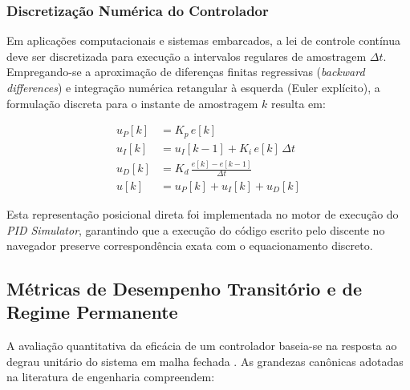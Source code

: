 \subsubsection{Discretização Numérica do Controlador}
\label{subsubsec:discretizacao_pid}

Em aplicações computacionais e sistemas embarcados, a lei de controle contínua deve ser discretizada para execução a intervalos regulares de amostragem $\Delta t$. Empregando-se a aproximação de diferenças finitas regressivas (\textit{backward differences}) e integração numérica retangular à esquerda (Euler explícito), a formulação discreta para o instante de amostragem $k$ resulta em:

\begin{align}
    u_P[k] &= K_p \, e[k] \label{eq:p_discreto} \\
    u_I[k] &= u_I[k-1] + K_i \, e[k] \, \Delta t \label{eq:i_discreto} \\
    u_D[k] &= K_d \, \frac{e[k] - e[k-1]}{\Delta t} \label{eq:d_discreto} \\
    u[k] &= u_P[k] + u_I[k] + u_D[k] \label{eq:pid_discreto}
\end{align}

Esta representação posicional direta foi implementada no motor de execução do \textit{PID Simulator}, garantindo que a execução do código escrito pelo discente no navegador preserve correspondência exata com o equacionamento discreto.

\subsection{Métricas de Desempenho Transitório e de Regime Permanente}
\label{subsec:metricas_desempenho}

A avaliação quantitativa da eficácia de um controlador baseia-se na resposta ao degrau unitário do sistema em malha fechada \cite{dorf2017}. As grandezas canônicas adotadas na literatura de engenharia compreendem:

